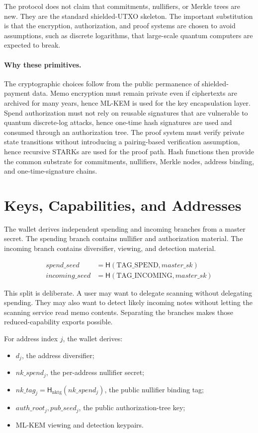 \documentclass[11pt]{article}
\newcommand{\Hash}{\mathsf{H}}
\begin{document}
The protocol does not claim that commitments, nullifiers, or Merkle trees are
new. They are the standard shielded-UTXO skeleton. The important substitution is
that the encryption, authorization, and proof systems are chosen to avoid
assumptions, such as discrete logarithms, that large-scale quantum computers
are expected to break.

\paragraph{Why these primitives.}
The cryptographic choices follow from the public permanence of shielded-payment
data. Memo encryption must remain private even if ciphertexts are archived for
many years, hence ML-KEM is used for the key encapsulation layer. Spend
authorization must not rely on reusable signatures that are vulnerable to
quantum discrete-log attacks, hence one-time hash signatures are used and
consumed through an authorization tree. The proof system must verify private
state transitions without introducing a pairing-based verification assumption,
hence recursive STARKs are used for the proof path. Hash functions then provide
the common substrate for commitments, nullifiers, Merkle nodes, address binding,
and one-time-signature chains.

\section{Keys, Capabilities, and Addresses}

The wallet derives independent spending and incoming branches from a master
secret. The spending branch contains nullifier and authorization material. The
incoming branch contains diversifier, viewing, and detection material.

\[
\begin{aligned}
spend\_seed &= \Hash(\mathrm{TAG\_SPEND}, master\_sk) \\
incoming\_seed &= \Hash(\mathrm{TAG\_INCOMING}, master\_sk)
\end{aligned}
\]

This split is deliberate. A user may want to delegate scanning without
delegating spending. They may also want to detect likely incoming notes without
letting the scanning service read memo contents. Separating the branches makes
those reduced-capability exports possible.

For address index \(j\), the wallet derives:

\begin{itemize}
  \item \(d_j\), the address diversifier;
  \item \(nk\_spend_j\), the per-address nullifier secret;
  \item \(nk\_tag_j = \Hash_{\mathrm{nktg}}(nk\_spend_j)\), the public
        nullifier binding tag;
  \item \(auth\_root_j, pub\_seed_j\), the public authorization-tree key;
  \item ML-KEM viewing and detection keypairs.
\end{itemize}
\end{document}
